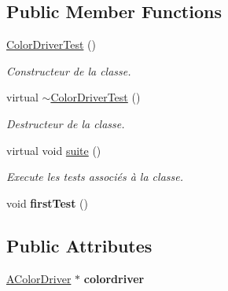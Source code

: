 \subsection*{Public Member Functions}
\begin{DoxyCompactItemize}
\item 
\mbox{\label{classtest_1_1ColorDriverTest_a4d1334f41b55f0a6cff839175c0b559c}} 
\hyperlink{classtest_1_1ColorDriverTest_a4d1334f41b55f0a6cff839175c0b559c}{Color\+Driver\+Test} ()
\begin{DoxyCompactList}\small\item\em Constructeur de la classe. \end{DoxyCompactList}\item 
\mbox{\label{classtest_1_1ColorDriverTest_aea57c02f0f8a655a6d35add18e5b3f4b}} 
virtual \hyperlink{classtest_1_1ColorDriverTest_aea57c02f0f8a655a6d35add18e5b3f4b}{$\sim$\+Color\+Driver\+Test} ()
\begin{DoxyCompactList}\small\item\em Destructeur de la classe. \end{DoxyCompactList}\item 
\mbox{\label{classtest_1_1ColorDriverTest_a0ca8fdc61ffcd90e8adf2c011807d0c2}} 
virtual void \hyperlink{classtest_1_1ColorDriverTest_a0ca8fdc61ffcd90e8adf2c011807d0c2}{suite} ()
\begin{DoxyCompactList}\small\item\em Execute les tests associés à la classe. \end{DoxyCompactList}\item 
\mbox{\label{classtest_1_1ColorDriverTest_abb7f76af8d8b155f40fe1809a6798f4e}} 
void {\bfseries first\+Test} ()
\end{DoxyCompactItemize}
\subsection*{Public Attributes}
\begin{DoxyCompactItemize}
\item 
\mbox{\label{classtest_1_1ColorDriverTest_a5ff3538bd24d035261adba1322483fe3}} 
\hyperlink{classAColorDriver}{A\+Color\+Driver} $\ast$ {\bfseries colordriver}
\end{DoxyCompactItemize}
